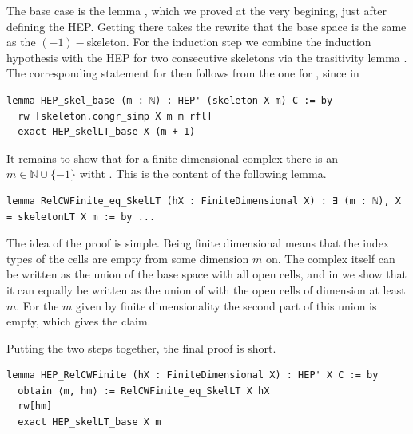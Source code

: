 \documentclass[11pt, a4paper, english]{article}
\theoremstyle{plain}
\theoremstyle{definition}
\theoremstyle{remark}
\numberwithin{equation}{section}
\numberwithin{theorem}{section}
\begin{document}
The base case is the lemma , which we proved at the very begining, just after defining the HEP. Getting there takes the rewrite that the base space is the same as the $(-1)-$skeleton. For the induction step we combine the induction hypothesis with the HEP for two consecutive skeletons via the trasitivity lemma . \\
The corresponding statement for  then follows from the one for , since  in \\
\begin{verbatim}
lemma HEP_skel_base (m : ℕ) : HEP' (skeleton X m) C := by
  rw [skeleton.congr_simp X m m rfl]
  exact HEP_skelLT_base X (m + 1)
\end{verbatim}


It remains to show that for a finite dimensional complex there is an $m \in \mathbb{N} \cup \{-1\}$ witht . This is the content of the following lemma.
\begin{verbatim}
lemma RelCWFinite_eq_SkelLT (hX : FiniteDimensional X) : ∃ (m : ℕ), X = skeletonLT X m := by ...    
\end{verbatim}
The idea of the proof is simple. Being finite dimensional means that the index types of the cells are empty from some dimension $m$ on. The complex itself can be written as the union of the base space with all open cells, and in  we show that it can equally be written as the union of  with the open cells of dimension at least $m$. For the $m$ given by finite dimensionality the second part of this union is empty, which gives the claim.

Putting the two steps together, the final proof is short.
\begin{verbatim}
lemma HEP_RelCWFinite (hX : FiniteDimensional X) : HEP' X C := by
  obtain ⟨m, hm⟩ := RelCWFinite_eq_SkelLT X hX
  rw[hm]
  exact HEP_skelLT_base X m
\end{verbatim}
\end{document}

